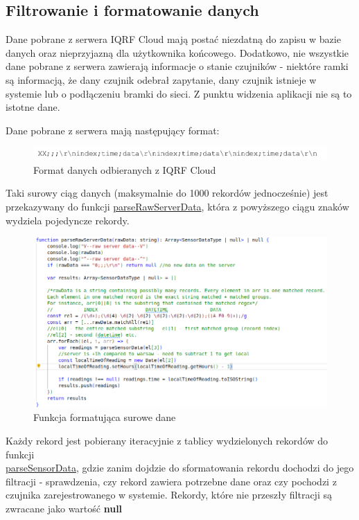 \subsection{Filtrowanie i formatowanie danych}
Dane pobrane z serwera IQRF Cloud mają postać niezdatną do zapisu w bazie danych oraz nieprzyjazną dla użytkownika końcowego. Dodatkowo, nie wszystkie dane pobrane z 
serwera zawierają informacje o stanie czujników - niektóre ramki są informacją, że dany czujnik odebrał zapytanie, dany czujnik istnieje w systemie lub o podłączeniu
bramki do sieci. Z punktu widzenia aplikacji nie są to istotne dane.

Dane pobrane z serwera mają następujący format:

\begin{figure}[H]
    \includegraphics[width=\textwidth]{zdj/app/data-shape-iqrf.png}
    \caption{Format danych odbieranych z IQRF Cloud \cite{iqrfcloud-guide}}
\end{figure}

Taki surowy ciąg danych (maksymalnie do 1000 rekordów jednocześnie) jest przekazywany do funkcji \underline{parseRawServerData}, która z powyższego ciągu znaków
wydziela pojedyncze rekordy.

\begin{figure}[H]
    \includegraphics[width=\textwidth]{zdj/app/parse-raw.png}
    \caption{Funkcja formatująca surowe dane}
\end{figure}

Każdy rekord jest pobierany iteracyjnie z tablicy wydzielonych rekordów do funkcji \\ \underline{parseSensorData}, gdzie zanim dojdzie do sformatowania rekordu 
dochodzi do jego filtracji - sprawdzenia, czy rekord zawiera potrzebne dane oraz czy pochodzi z czujnika zarejestrowanego w systemie. Rekordy, które nie przeszły filtracji 
są zwracane jako wartość \textbf{null}

